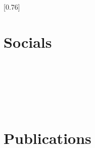 \documentclass[ats, jdlanctot]{mycv}
\begin{document}
\setlength{\columnsep}{1.2cm}
[0.76]
\begin{paracol}{2}

\paracolbackgroundoptions

\atsleftcolumnfont
{\setasidefontcolour
\flushleft
\vspace{-0.7em}

\begin{minipage}[t]{0.24\textwidth}
\section*{Socials}
\href{\myEmailHref}{%
}\\[0.6em]
\href{\myTwitterHref}{%
}\\[0.6em]
\href{\myLinkedInHref}{%
}\\[0.6em]
\href{\myGitHubHref}{%
}
\end{minipage}\\[1.2em]

\begin{minipage}[t]{0.24\textwidth}
\section*{Publications}
\href{\myGoogleScholarHref}{%
}\\[0.6em]
\href{\myOrchidHref}{%
}
\end{minipage}\\[0.5em]

}
\end{paracol}
\end{document}
